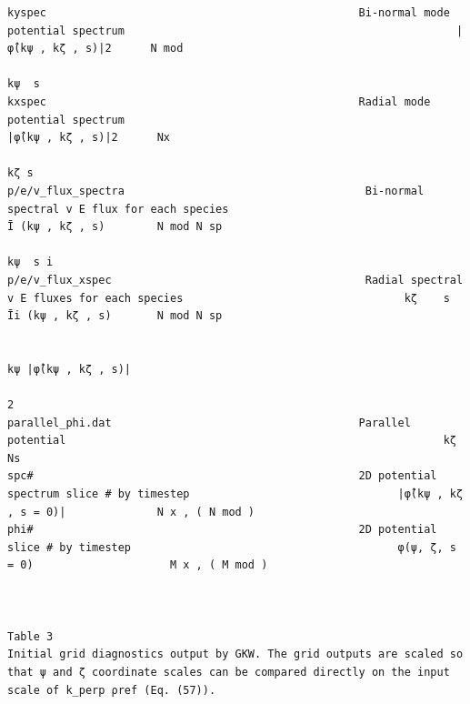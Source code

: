 \documentclass[a4paper]{article}
\newcommand{\gkwpagefont}{\fontsize{6.0pt}{7.55pt}\selectfont}
\begin{document}
\begin{Verbatim}[fontsize=\gkwpagefont]
kyspec                                                Bi-normal mode potential spectrum                                                   |φ̂(kψ , kζ , s)|2      N mod
                                                                                                                               kψ  s
kxspec                                                Radial mode potential spectrum                                                      |φ̂(kψ , kζ , s)|2      Nx
                                                                                                                               kζ s
p/e/v_flux_spectra                                     Bi-normal spectral v E flux for each species                                         Ī (kψ , kζ , s)        N mod N sp
                                                                                                                               kψ  s i
p/e/v_flux_xspec                                       Radial spectral v E fluxes for each species                                  kζ    s Īi (kψ , kζ , s)       N mod N sp
                                                                                                                                
                                                                                                                                        kψ |φ̂(kψ , kζ , s)|
                                                                                                                                                             2
parallel_phi.dat                                      Parallel potential                                                          kζ                              Ns
spc#                                                  2D potential spectrum slice # by timestep                                |φ̂(kψ , kζ , s = 0)|              N x , ( N mod )
phi#                                                  2D potential slice # by timestep                                         φ(ψ, ζ, s = 0)                     M x , ( M mod )



Table 3
Initial grid diagnostics output by GKW. The grid outputs are scaled so that ψ and ζ coordinate scales can be compared directly on the input scale of k_perp ρref (Eq. (57)).


\end{Verbatim}
\end{document}
